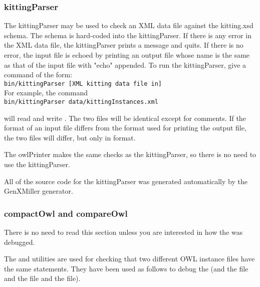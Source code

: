 \subsubsection{kittingParser}
The kittingParser may be used to check an XML data file against the
kitting.xsd schema. The schema is hard-coded into the kittingParser.
If there is any error in the XML data file, the kittingParser prints
a message and quits. If there is no error, the input file is echoed by
printing an output file whose name is the same as that of the input file
with "echo" appended. To run the kittingParser, give a command of the
form:\\
\texttt{bin/kittingParser [XML kitting data file in]}\\

For example, the command\\

\texttt{bin/kittingParser data/kittingInstances.xml}

will read  and write . The
two files will be identical except for comments. If the format of an
input file differs from the format used for printing the output file,
the two files will differ, but only in format.

The owlPrinter makes the same checks as the kittingParser, so there is
no need to use the kittingParser.

All of the source code for the kittingParser was generated automatically
by the GenXMiller generator.

\subsubsection{compactOwl and compareOwl}
There is no need to read this section unless you are interested in how the
 was debugged.

The  and  utilities are used for checking that two
different OWL instance files have the same statements. They have been
used as follows to debug the  (and the  file
and the  file and the  file).

